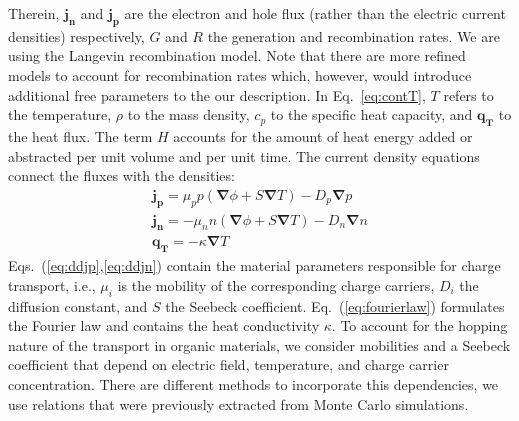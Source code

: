 \documentclass[%
9pt,
 aip,
rsi,%
 amsmath,amssymb,
preprint,%
]{revtex4-1}
\begin{document}
Therein, $\mathbf{j_n}$ and $\mathbf{j_p}$ are the electron and hole flux (rather than the electric current densities) respectively, $G$ and $R$ the generation and recombination rates. We are using the Langevin recombination model.\cite{Langevin1903} 
Note that there are more refined models to account for recombination rates which, however, would introduce additional free parameters to the our description.\cite{Lee2014,VanDerHolst2009} 
In Eq.~\ref{eq:contT}, $T$ refers to the temperature, $\rho$ to the mass density, $c_p$ to the specific heat capacity, and  $\mathbf{q_T}$ to the heat flux.
The term $H$ accounts for the amount of heat energy added or abstracted per unit volume and per unit time. 
The current density equations connect the fluxes with the densities: 
\begin{subequations}
	\begin{gather}
		\mathbf{j_p}=\mu_p p \left(\mathbf{\nabla} \phi + S \mathbf{\nabla} T \right) - D_p \mathbf{\nabla} p \label{eq:ddjp} \\
		\mathbf{j_n}=-\mu_n n \left(\mathbf{\nabla} \phi + S \mathbf{\nabla} T \right) - D_n \mathbf{\nabla} n \label{eq:ddjn} \\
		\mathbf{q_T}=-\kappa \mathbf{\nabla} T\qquad \label{eq:fourierlaw}
	\end{gather}
    \label{eq:connectionDensitiesToFluxes}
\end{subequations}
Eqs.~(\ref{eq:ddjp},\ref{eq:ddjn}) contain the material parameters responsible for charge transport, i.e., $\mu_i$ is the mobility of the corresponding charge carriers, $D_i$ the diffusion constant, and $S$ the Seebeck coefficient. Eq.~(\ref{eq:fourierlaw}) formulates the Fourier law and contains the heat conductivity $\kappa$.
To account for the hopping nature of the transport in organic materials, we consider mobilities and a Seebeck coefficient that  depend on electric field, temperature, and charge carrier concentration. 
There are different methods to incorporate this dependencies,\cite{Fishchuk2010,Fishchuk2013} we use relations that were previously extracted from Monte Carlo simulations.\cite{Lu2015,Pasveer2005}
\end{document}
